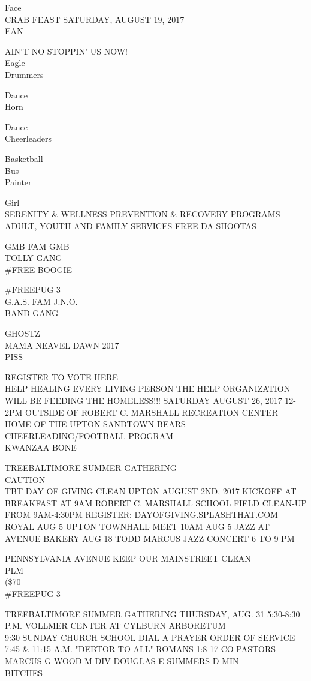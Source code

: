 \documentclass[10pt,letterpaper]{article}
\begin{document}
Face\\
CRAB FEAST SATURDAY, AUGUST 19, 2017\\
EAN

AIN'T NO STOPPIN' US NOW!\\
Eagle\\
Drummers

Dance\\
Horn

Dance\\
Cheerleaders

Basketball\\
Bus\\
Painter

Girl\\
SERENITY \& WELLNESS PREVENTION \& RECOVERY PROGRAMS ADULT, YOUTH AND FAMILY SERVICES FREE DA SHOOTAS

GMB FAM GMB\\
TOLLY GANG\\
\#FREE BOOGIE

\#FREEPUG 3\\
G.A.S. FAM J.N.O.\\
BAND GANG

GHOSTZ\\
MAMA NEAVEL DAWN 2017\\
PISS

REGISTER TO VOTE HERE\\
HELP HEALING EVERY LIVING PERSON THE HELP ORGANIZATION WILL BE FEEDING THE HOMELESS!!! SATURDAY AUGUST 26, 2017 12{-}2PM OUTSIDE OF ROBERT C. MARSHALL RECREATION CENTER\\
HOME OF THE UPTON SANDTOWN BEARS CHEERLEADING/FOOTBALL PROGRAM\\
KWANZAA BONE

TREEBALTIMORE SUMMER GATHERING\\
CAUTION\\
TBT DAY OF GIVING CLEAN UPTON AUGUST 2ND, 2017 KICKOFF AT BREAKFAST AT 9AM ROBERT C. MARSHALL SCHOOL FIELD CLEAN{-}UP FROM 9AM{-}4:30PM REGISTER: DAYOFGIVING.SPLASHTHAT.COM\\
ROYAL AUG 5 UPTON TOWNHALL MEET 10AM AUG 5 JAZZ AT AVENUE BAKERY AUG 18 TODD MARCUS JAZZ CONCERT 6 TO 9 PM

PENNSYLVANIA AVENUE KEEP OUR MAINSTREET CLEAN\\
PLM\\
(\$70\\
\#FREEPUG 3

TREEBALTIMORE SUMMER GATHERING THURSDAY, AUG. 31 5:30{-}8:30 P.M. VOLLMER CENTER AT CYLBURN ARBORETUM\\
9:30 SUNDAY CHURCH SCHOOL DIAL A PRAYER ORDER OF SERVICE 7:45 \& 11:15 A.M. "DEBTOR TO ALL" ROMANS 1:8{-}17 CO{-}PASTORS MARCUS G WOOD M DIV DOUGLAS E SUMMERS D MIN\\
BITCHES
\end{document}
